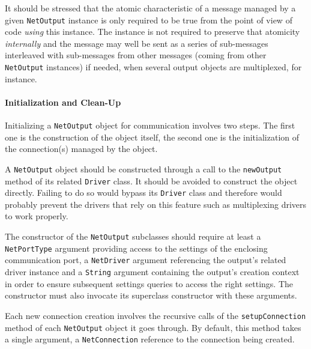 \documentclass[11pt]{book}
\begin{document}
It should be stressed that the atomic characteristic of a message
managed by a given \texttt{NetOutput} instance is only required to be
true from the point of view of code \emph{using} this instance. The
instance is not required to preserve that atomicity \emph{internally}
and the message may well be sent as a series of sub-messages
interleaved with sub-messages from other messages (coming from other
\texttt{NetOutput} instances) if needed, when several output objects
are multiplexed, for instance.

\paragraph{Initialization and Clean-Up}
\label{sec:init-clean-up}

Initializing a \texttt{NetOutput} object for communication involves
two steps. The first one is the construction of the object itself, the
second one is the initialization of the connection(s) managed by the
object.

A \texttt{NetOutput} object should be constructed through a call to
the \texttt{newOutput} method of its related \texttt{Driver} class. It
should be avoided to construct the object directly. Failing to do so
would bypass its \texttt{Driver} class and therefore would probably
prevent the drivers that rely on this feature such as multiplexing
drivers to work properly.

The constructor of the \texttt{NetOutput} subclasses should require at
least a \texttt{NetPortType} argument providing access to the settings
of the enclosing communication port, a \texttt{NetDriver} argument
referencing the output's related driver instance and a \texttt{String}
argument containing the output's creation context in order to ensure
subsequent settings queries to access the right settings. The
constructor must also invocate its superclass constructor with these
arguments.

Each new connection creation involves the recursive calls of the
\texttt{setupConnection} method of each \texttt{NetOutput} object it
goes through. By default, this method takes a single argument, a
\texttt{NetConnection} reference to the connection being created.
\end{document}
